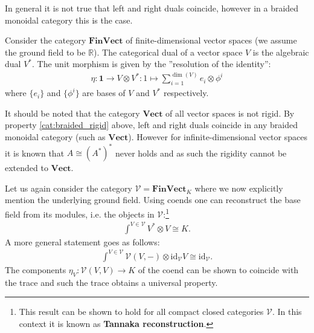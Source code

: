 
    \begin{property}\label{cat:braided_rigid}
        In general it is not true that left and right duals coincide, however in a braided monoidal category this is the case.
    \end{property}

    \begin{example}[FinVect]
        Consider the category $\mathbf{FinVect}$ of finite-dimensional vector spaces (we assume the ground field to be $\mathbb{R}$). The categorical dual of a vector space $V$ is the algebraic dual $V^*$. The unit morphism is given by the ''resolution of the identity'':
        \begin{gather}
            \eta: \mathbf{1}\rightarrow V\otimes V^*:1\mapsto\sum_{i=1}^{\dim(V)}e_i\otimes \phi^i
        \end{gather}
        where $\{e_i\}$ and $\{\phi^i\}$ are bases of $V$ and $V^*$ respectively.

        It should be noted that the category $\mathbf{Vect}$ of all vector spaces is not rigid. By property \ref{cat:braided_rigid} above, left and right duals coincide in any braided monoidal category (such as $\mathbf{Vect}$). However for infinite-dimensional vector spaces it is known that $A\cong(A^*)^*$ never holds and as such the rigidity cannot be extended to $\mathbf{Vect}$.
    \end{example}
    \begin{property}
        Let us again consider the category $\mathcal{V}=\mathbf{FinVect}_K$ where we now explicitly mention the underlying ground field. Using coends one can reconstruct the base field from its modules, i.e. the objects in $\mathcal{V}$:\footnote{This result can be shown to hold for all compact closed categories $\mathcal{V}$. In this context it is known as \textbf{Tannaka reconstruction}.}
        \begin{gather}
            \int^{V\in\mathcal{V}}V^*\otimes V\cong K.
        \end{gather}
        A more general statement goes as follows:
        \begin{gather}
            \int^{V\in\mathcal{V}}\mathcal{V}(V, -)\otimes\text{id}_{\mathcal{V}}V\cong\text{id}_{\mathcal{V}}.
        \end{gather}
        The components $\eta_V:\mathcal{V}(V, V)\rightarrow K$ of the coend can be shown to coincide with the trace and such the trace obtains a universal property.
    \end{property}
